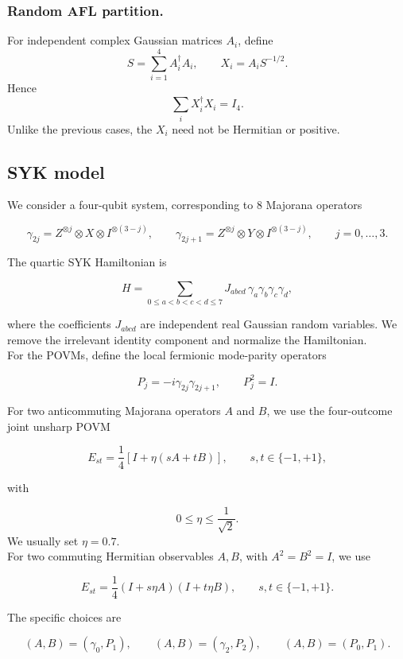 \documentclass{article}
\begin{document}
\subsubsection{Random AFL partition.}
For independent complex Gaussian matrices $A_i$, define
\begin{equation}
S=\sum_{i=1}^4A_i^\dagger A_i,
\qquad
X_i=A_iS^{-1/2}.
\end{equation}
Hence
\begin{equation}
\sum_iX_i^\dagger X_i=I_4.
\end{equation}
Unlike the previous cases, the $X_i$ need not be Hermitian or positive.

\subsection{SYK model}
We consider a four-qubit system, corresponding to \(8\) Majorana operators

$$
\gamma_{2j}
=
Z^{\otimes j}\otimes X\otimes I^{\otimes(3-j)},
\qquad
\gamma_{2j+1}
=
Z^{\otimes j}\otimes Y\otimes I^{\otimes(3-j)},
\qquad
j=0,\ldots,3.
$$

The quartic SYK Hamiltonian is

$$
H=\sum_{0\leq a<b<c<d\leq 7}
J_{abcd}\,
\gamma_a\gamma_b\gamma_c\gamma_d,
$$

where the coefficients \(J_{abcd}\) are independent real Gaussian random variables. We remove the irrelevant identity component and normalize the Hamiltonian.\\
For the POVMs, define the local fermionic mode-parity operators

$$
P_j
=
-i\gamma_{2j}\gamma_{2j+1},
\qquad
P_j^2=I.
$$

For two anticommuting Majorana operators \(A\) and \(B\), we use the four-outcome joint unsharp POVM

$$
E_{st}
=
\frac14
\left[
I+\eta(sA+tB)
\right],
\qquad
s,t\in\{-1,+1\},
$$

with

$$
0\leq\eta\leq\frac1{\sqrt2}.
$$
We usually set $\eta = 0.7$.\\
For two commuting Hermitian observables \(A,B\), with \(A^2=B^2=I\), we use

$$
E_{st}
=
\frac14
(I+s\eta A)(I+t\eta B),
\qquad
s,t\in\{-1,+1\}.
$$

The specific choices are

$$
(A,B)=(\gamma_0,P_1),
\qquad
(A,B)=(\gamma_2,P_2),
\qquad
(A,B)=(P_0,P_1).
$$
\end{document}
